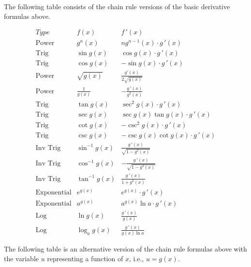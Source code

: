 \documentclass[handout]{ximera}
\begin{document}
The following table consists of the chain rule versions of the basic derivative formulas above.

\begin{center}
\[
\begin{array}{c|c|c}
		Type & f(x) & f\,'(x)  \\
		\hline
		\text{Power} & g^n(x) & ng^{n-1}(x)\cdot g\,'(x)  \\[8pt]
		\hline
		\text{Trig} & \sin g(x)  & \cos g(x)  \cdot g\,'(x) \\[8pt]
		\text{Trig} & \cos g(x)  & -\sin g(x)\cdot g\,'(x)  \\[8pt]
		\hline
		\text{Power} & \sqrt{g(x)} & \displaystyle \frac{g'(x)}{2\sqrt {g(x)}}\\[8pt]
		\text{Power} & \displaystyle \frac{1}{g(x)} & -\displaystyle \frac{g\,'(x)}{g^2(x)}\\[8pt]
	  \hline
	  \text{Trig} & \tan g(x)  & \sec^2 g(x)  \cdot g\,'(x) \\[8pt]
		\text{Trig} & \sec g(x)  & \sec g(x) \tan g(x)  \cdot g\,'(x) \\[8pt]
		\hline
		\text{Trig} & \cot g(x)  & -\csc^2 g(x)  \cdot g\,'(x)  \\[8pt]
		\text{Trig} & \csc g(x)  & -\csc g(x) \cot g(x)  \cdot g\,'(x)  \\[8pt]
		\hline
		\text{Inv Trig} & \sin^{-1} g(x)  &   \displaystyle \frac{g\,'(x)}{\sqrt{1-g^2(x)}}  \\[8pt]
		\text{Inv Trig} & \cos^{-1} g(x)  &   \displaystyle -\frac{g\,'(x)}{\sqrt{1-g^2(x)}}\\[8pt]
		\text{Inv Trig} & \tan^{-1} g(x)  &   \displaystyle \frac{g\,'(x)}{1+g^2(x)} \\[8pt]
		\hline
		\text{Exponential} & e^{g(x)} & e^{g(x)} \cdot g\,'(x) \\[8pt]
		\text{Exponential} & a^{g(x)} & a^{g(x)}\ln a \cdot g\,'(x) \\[8pt]
		\hline
		\text{Log} & \ln g(x)  &   \displaystyle \frac{g\,'(x)}{g(x)} \\[8pt]
		\text{Log} & \log_a g(x)  &   \displaystyle \frac{g\,'(x)}{g(x)\ln a}
	\end{array}
    \]
\end{center}


The following table is an alternative version of the chain rule formulas above 
with the variable $u$ representing a function of $x$, i.e., $u = g(x)$.
\end{document}
